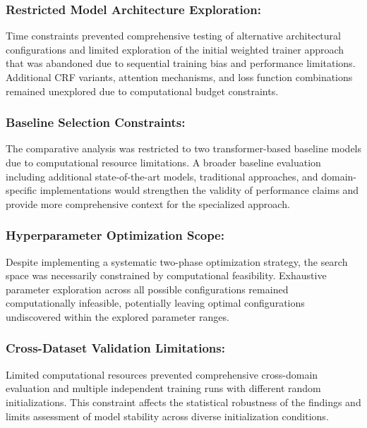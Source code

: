\documentclass[a4paper]{usiinfbachelorproject}
\begin{document}
\subsubsection{\textbf{Restricted Model Architecture Exploration:}} Time constraints prevented comprehensive testing of alternative architectural configurations and limited exploration of the initial weighted trainer approach that was abandoned due to sequential training bias and performance limitations. Additional CRF variants, attention mechanisms, and loss function combinations remained unexplored due to computational budget constraints.

\subsubsection{\textbf{Baseline Selection Constraints:}} The comparative analysis was restricted to two transformer-based baseline models due to computational resource limitations. A broader baseline evaluation including additional state-of-the-art models, traditional approaches, and domain-specific implementations would strengthen the validity of performance claims and provide more comprehensive context for the specialized approach.

\subsubsection{\textbf{Hyperparameter Optimization Scope:}} Despite implementing a systematic two-phase optimization strategy, the search space was necessarily constrained by computational feasibility. Exhaustive parameter exploration across all possible configurations remained computationally infeasible, potentially leaving optimal configurations undiscovered within the explored parameter ranges.

\subsubsection{\textbf{Cross-Dataset Validation Limitations:}} Limited computational resources prevented comprehensive cross-domain evaluation and multiple independent training runs with different random initializations. This constraint affects the statistical robustness of the findings and limits assessment of model stability across diverse initialization conditions.
\end{document}
